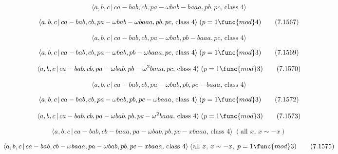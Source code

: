 \documentclass[10pt]{article}
\begin{document}
\begin{equation}
\langle a,b,c\,|\,ca-bab,cb,pa-\omega bab-baaa,pb,pc,\,\text{class }4\rangle
\tag{7.1566}
\end{equation}

\begin{equation}
\langle a,b,c\,|\,ca-bab,cb,pa-\omega bab-\omega baaa,pb,pc,\,\text{class }%
4\rangle \;(p=1\func{mod}4)  \tag{7.1567}
\end{equation}

\begin{equation}
\langle a,b,c\,|\,ca-bab,cb,pa-\omega bab,pb-baaa,pc,\,\text{class }4\rangle
\tag{7.1568}
\end{equation}

\begin{equation}
\langle a,b,c\,|\,ca-bab,cb,pa-\omega bab,pb-\omega baaa,pc,\,\text{class }%
4\rangle \;(p=1\func{mod}3)  \tag{7.1569}
\end{equation}

\begin{equation}
\langle a,b,c\,|\,ca-bab,cb,pa-\omega bab,pb-\omega ^{2}baaa,pc,\,\text{%
class }4\rangle \;(p=1\func{mod}3)  \tag{7.1570}
\end{equation}

\begin{equation}
\langle a,b,c\,|\,ca-bab,cb,pa-\omega bab,pb,pc-baaa,\,\text{class }4\rangle
\tag{7.1571}
\end{equation}

\begin{equation}
\langle a,b,c\,|\,ca-bab,cb,pa-\omega bab,pb,pc-\omega baaa,\,\text{class }%
4\rangle \;(p=1\func{mod}3)  \tag{7.1572}
\end{equation}

\begin{equation}
\langle a,b,c\,|\,ca-bab,cb,pa-\omega bab,pb,pc-\omega ^{2}baaa,\,\text{%
class }4\rangle \;(p=1\func{mod}3)  \tag{7.1573}
\end{equation}

\begin{equation}
\langle a,b,c\,|\,ca-bab,cb-baaa,pa-\omega bab,pb,pc-xbaaa,\,\text{class }%
4\rangle \;(\text{all }x,\,x\sim -x)  \tag{7.1574}
\end{equation}

\begin{equation}
\langle a,b,c\,|\,ca-bab,cb-\omega baaa,pa-\omega bab,pb,pc-xbaaa,\,\text{%
class }4\rangle \;(\text{all }x,\,x\sim -x,\;p=1\func{mod}3)  \tag{7.1575}
\end{equation}
\end{document}
